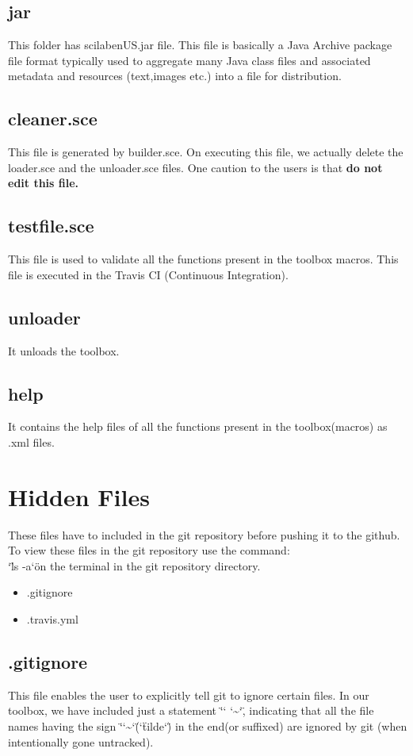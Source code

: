 \documentclass[12pt,a4paper]{report}
\begin{document}
\subsection{jar}
This folder has scilab\textunderscore en\textunderscore US.jar file. This file is basically a Java Archive package file format typically used to aggregate many Java class files and associated metadata and resources (text,images etc.) into a file for distribution.

\subsection{cleaner.sce}
This file is generated by builder.sce. On executing this file, we actually delete the loader.sce and the unloader.sce files.
One caution to the users is that  \textbf{do not edit this file.}

\subsection{testfile.sce}
This file is used to validate all the functions present in the toolbox macros. This file is executed in the Travis CI (Continuous Integration).

\subsection{unloader}
It unloads the toolbox.

\subsection{help}
It contains the help files of all the functions present in the toolbox(macros) as .xml files.

\section{Hidden Files}
These files have to included in the git repository before pushing it to the github. To view these files in the git repository use the command:  \\
\char`\"ls -a\char`\"   on the terminal in the git repository directory.  


\begin{itemize}
\item .gitignore 
\item .travis.yml
\end{itemize}

\subsection{.gitignore}
This file enables the user to explicitly tell git to ignore certain files. In our toolbox, we have included just a statement  \char`\" \char`\* \char`\~ \char`\" , indicating that all the file names having the sign \char`\"\char`\~\char`\" (\char`\"tilde\char`\") in the end(or suffixed) are ignored by git (when intentionally gone untracked).  
\end{document}
